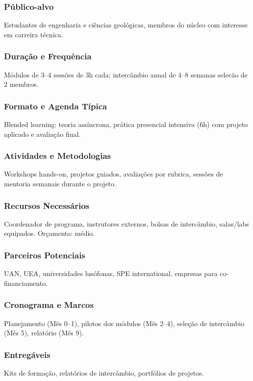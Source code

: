 \documentclass[12pt,a4paper]{article}
\begin{document}
\subsubsection*{Público-alvo}
Estudantes de engenharia e ciências geológicas, membros do núcleo com interesse em carreira técnica.

\subsubsection*{Duração e Frequência}
Módulos de 3–4 sessões de 3h cada; intercâmbio anual de 4–8 semanas selecão de 2 membros.

\subsubsection*{Formato e Agenda Típica}
Blended learning: teoria assíncrona, prática presencial intensiva (6h) com projeto aplicado e avaliação final.

\subsubsection*{Atividades e Metodologias}
Workshops hands-on, projetos guiados, avaliações por rubrica, sessões de mentoria semanais durante o projeto.

\subsubsection*{Recursos Necessários}
Coordenador de programa, instrutores externos, bolsas de intercâmbio, salas/labs equipados. Orçamento: médio.

\subsubsection*{Parceiros Potenciais}
UAN, UEA, universidades lusófonas, SPE international, empresas para co-financiamento.

\subsubsection*{Cronograma e Marcos}
Planejamento (Mês 0–1), pilotos dos módulos (Mês 2–4), seleção de intercâmbio (Mês 5), relatório (Mês 9).

\subsubsection*{Entregáveis}
Kits de formação, relatórios de intercâmbio, portfólios de projetos.
\end{document}
